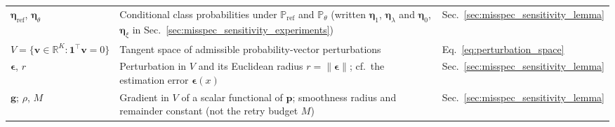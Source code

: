 {\begin{longtable}{@{}l >{\raggedright\arraybackslash}p{8cm} l@{}}
$\boldsymbol{\eta}_{\mathrm{ref}}$, $\boldsymbol{\eta}_\theta$ & Conditional class probabilities under $\mathbb{P}_{\mathrm{ref}}$ and $\mathbb{P}_\theta$ (written $\boldsymbol{\eta}_1$, $\boldsymbol{\eta}_\lambda$ and $\boldsymbol{\eta}_0$, $\boldsymbol{\eta}_\xi$ in Sec.~\ref{sec:misspec_sensitivity_experiments}) & Sec.~\ref{sec:misspec_sensitivity_lemma} \\
$V = \{\mathbf{v} \in \mathbb{R}^K : \mathbf{1}^\top\mathbf{v} = 0\}$ & Tangent space of admissible probability-vector perturbations & Eq.~\eqref{eq:perturbation_space} \\
$\boldsymbol{\epsilon}$, $r$ & Perturbation in $V$ and its Euclidean radius $r = \|\boldsymbol{\epsilon}\|$; cf.\ the estimation error $\boldsymbol{\epsilon}(x)$ & Sec.~\ref{sec:misspec_sensitivity_lemma} \\
$\mathbf{g}$; $\rho$, $M$ & Gradient in $V$ of a scalar functional of $\mathbf{p}$; smoothness radius and remainder constant (not the retry budget $M$) & Sec.~\ref{sec:misspec_sensitivity_lemma} \\
\end{longtable}
}
